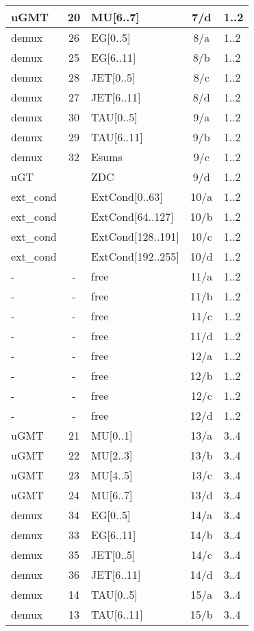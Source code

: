 \begin{longtable}{|l|c|l|c|l|}
uGMT  & 20  & MU[6..7]   & 7/d  & 1..2 \\\hline
demux & 26  & EG[0..5]   & 8/a  & 1..2 \\\hline
demux & 25  & EG[6..11]  & 8/b  & 1..2 \\\hline
demux & 28  & JET[0..5]  & 8/c  & 1..2 \\\hline
demux & 27  & JET[6..11] & 8/d  & 1..2 \\\hline
demux & 30  & TAU[0..5]  & 9/a  & 1..2 \\\hline
demux & 29  & TAU[6..11] & 9/b  & 1..2 \\\hline
demux & 32  & Esums      & 9/c  & 1..2 \\\hline
uGT &    & ZDC      & 9/d  & 1..2 \\\hline
ext\_cond &     & ExtCond[0..63]    & 10/a & 1..2 \\\hline
ext\_cond &     & ExtCond[64..127]  & 10/b & 1..2 \\\hline
ext\_cond &     & ExtCond[128..191] & 10/c & 1..2 \\\hline
ext\_cond &     & ExtCond[192..255] & 10/d & 1..2 \\\hline
- & - & free & 11/a & 1..2 \\\hline
- & - & free & 11/b & 1..2 \\\hline
- & - & free & 11/c & 1..2 \\\hline
- & - & free & 11/d & 1..2 \\\hline
- & - & free & 12/a & 1..2 \\\hline
- & - & free & 12/b & 1..2 \\\hline
- & - & free & 12/c & 1..2 \\\hline
- & - & free & 12/d & 1..2 \\\hline
\hline
uGMT  & 21  & MU[0..1]   & 13/a & 3..4 \\\hline
uGMT  & 22  & MU[2..3]   & 13/b & 3..4 \\\hline
uGMT  & 23  & MU[4..5]   & 13/c & 3..4 \\\hline
uGMT  & 24  & MU[6..7]   & 13/d & 3..4 \\\hline
demux & 34  & EG[0..5]   & 14/a & 3..4 \\\hline
demux & 33  & EG[6..11]  & 14/b & 3..4 \\\hline
demux & 35  & JET[0..5]  & 14/c & 3..4 \\\hline
demux & 36  & JET[6..11] & 14/d & 3..4 \\\hline
demux & 14  & TAU[0..5]  & 15/a & 3..4 \\\hline
demux & 13  & TAU[6..11] & 15/b & 3..4 \\\hline

\end{longtable}
